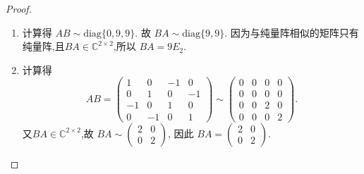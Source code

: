 \documentclass[../../main.tex]{subfiles}
\begin{document}
\begin{proof}
\begin{enumerate}
\item 计算得 \( AB \sim \text{diag}\{0, 9, 9\} \). 故 \( BA \sim \text{diag}\{9, 9\} \). 因为与纯量阵相似的矩阵只有纯量阵,且$BA\in \mathbb{C}^{2\times 2}$,所以 \( BA = 9E_2 \).

\item 计算得
\[
AB = \begin{pmatrix}
1 & 0 & -1 & 0 \\
0 & 1 & 0 & -1 \\
-1 & 0 & 1 & 0 \\
0 & -1 & 0 & 1
\end{pmatrix} \sim \begin{pmatrix}
0 & 0 & 0 & 0 \\
0 & 0 & 0 & 0 \\
0 & 0 & 2 & 0 \\
0 & 0 & 0 & 2
\end{pmatrix}.
\]
又$BA\in \mathbb{C}^{2\times 2}$,故 \( BA \sim \begin{pmatrix} 2 & 0 \\ 0 & 2 \end{pmatrix} \), 因此 \( BA = \begin{pmatrix} 2 & 0 \\ 0 & 2 \end{pmatrix} \).
\end{enumerate}

\end{proof}
\end{document}
